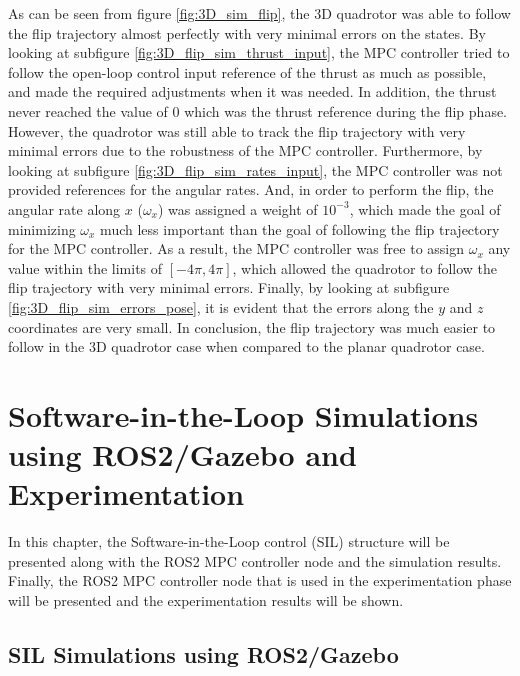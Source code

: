 \documentclass{thesisreport}
\begin{document}
\newpage

As can be seen from figure \ref{fig:3D_sim_flip}, the 3D quadrotor was able to follow the flip trajectory almost perfectly with very minimal errors on the states. By looking at subfigure \ref{fig:3D_flip_sim_thrust_input}, the MPC controller tried to follow the open-loop control input reference of the thrust as much as possible, and made the required adjustments when it was needed. In addition, the thrust never reached the value of 0 which was the thrust reference during the flip phase. However, the quadrotor was still able to track the flip trajectory with very minimal errors due to the robustness of the MPC controller. Furthermore, by looking at subfigure \ref{fig:3D_flip_sim_rates_input}, the MPC controller was not provided references for the angular rates. And, in order to perform the flip, the angular rate along $x$ ($\omega_x$) was assigned a weight of $10^{-3}$, which made the goal of minimizing $\omega_x$ much less important than the goal of following the flip trajectory for the MPC controller. As a result, the MPC controller was free to assign $\omega_x$ any value within the limits of $[-4 \pi, 4 \pi]$, which allowed the quadrotor to follow the flip trajectory with very minimal errors. Finally, by looking at subfigure \ref{fig:3D_flip_sim_errors_pose}, it is evident that the errors along the $y$ and $z$ coordinates are very small. In conclusion, the flip trajectory was much easier to follow in the 3D quadrotor case when compared to the planar quadrotor case. 
















  \chapter{Software-in-the-Loop Simulations using ROS2/Gazebo and Experimentation}
 	In this chapter, the Software-in-the-Loop control (SIL) structure will be presented along with the ROS2 MPC controller node and the simulation results. Finally, the ROS2 MPC controller node  that is used in the  experimentation phase will be presented and the experimentation results will be shown.
	\section{SIL Simulations using ROS2/Gazebo}\label{sec:SIL_simulations}
\end{document}
